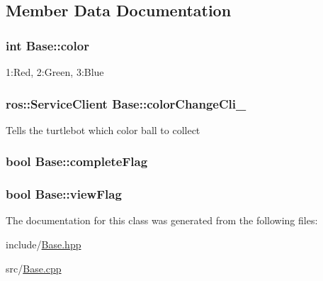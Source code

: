 \subsection{Member Data Documentation}
\subsubsection[{\texorpdfstring{color}{color}}]{\setlength{\rightskip}{0pt plus 5cm}int Base\+::color}\hypertarget{classBase_af4c79a5d92200b5adf98634163333876}{}\label{classBase_af4c79a5d92200b5adf98634163333876}
1\+:Red, 2\+:Green, 3\+:Blue 
\subsubsection[{\texorpdfstring{color\+Change\+Cli\+\_\+}{colorChangeCli_}}]{\setlength{\rightskip}{0pt plus 5cm}ros\+::\+Service\+Client Base\+::color\+Change\+Cli\+\_\+}\hypertarget{classBase_a874255744854a842b88ccab8674fca90}{}\label{classBase_a874255744854a842b88ccab8674fca90}
Tells the turtlebot which color ball to collect 
\subsubsection[{\texorpdfstring{complete\+Flag}{completeFlag}}]{\setlength{\rightskip}{0pt plus 5cm}bool Base\+::complete\+Flag}\hypertarget{classBase_a10b0afead866cc8cf2f5e2208a29d9f1}{}\label{classBase_a10b0afead866cc8cf2f5e2208a29d9f1}
\subsubsection[{\texorpdfstring{view\+Flag}{viewFlag}}]{\setlength{\rightskip}{0pt plus 5cm}bool Base\+::view\+Flag}\hypertarget{classBase_a23f826e2edce258c38dbe0c2b7f94c20}{}\label{classBase_a23f826e2edce258c38dbe0c2b7f94c20}


The documentation for this class was generated from the following files\+:\begin{DoxyCompactItemize}
\item 
include/\hyperlink{Base_8hpp}{Base.\+hpp}\item 
src/\hyperlink{Base_8cpp}{Base.\+cpp}\end{DoxyCompactItemize}
